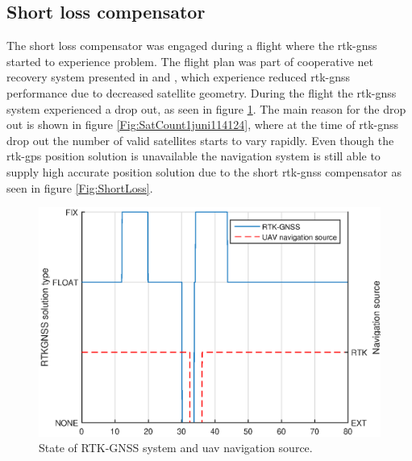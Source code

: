 \subsection{Short loss compensator}
The short loss compensator was engaged during a flight where the \gls{rtk-gnss} started to experience problem. The flight plan was part of cooperative net recovery system presented in \citep{Sigurd} and \citep{Jostein}, which experience reduced \gls{rtk-gnss} performance due to decreased satellite geometry. During the flight the \gls{rtk-gnss} system experienced a drop out, as seen in figure \ref{Fig:NavSource}. The main reason for the drop out is shown in figure \ref{Fig:SatCount1juni114124}, where at the time of \gls{rtk-gnss} drop out the number of valid satellites starts to vary rapidly. Even though the \gls{rtk-gps} position solution is unavailable the navigation system is still able to supply high accurate position solution due to the short \gls{rtk-gnss} compensator as seen in figure \ref{Fig:ShortLoss}.
\begin{figure}[H]
\centering
\includegraphics[scale=0.7]{figs/Experiment/navSource.eps}
\caption{State of RTK-GNSS system and \gls{uav} navigation source.}
\label{Fig:NavSource}
\end{figure}
